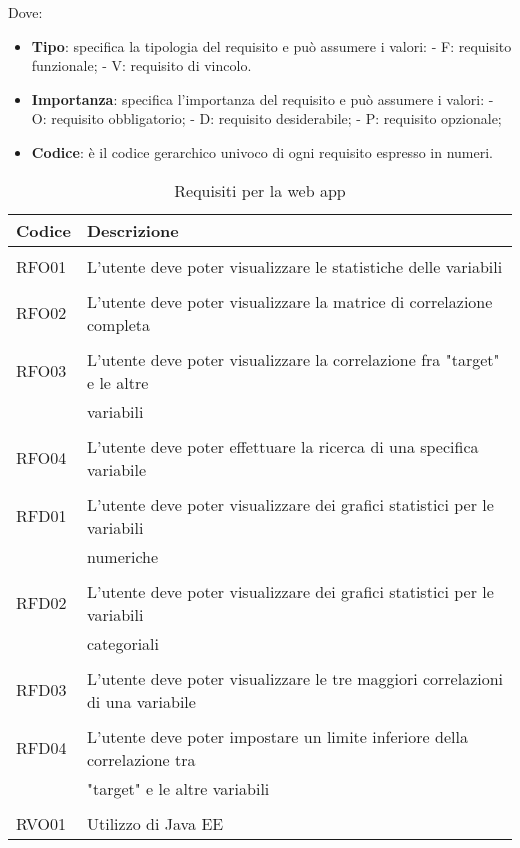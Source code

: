Dove:
\begin{itemize}
	\item \textbf{Tipo}: specifica la tipologia del requisito e può assumere i valori:
	\subitem - F: requisito funzionale;
	\subitem - V: requisito di vincolo.
	\item \textbf{Importanza}: specifica l'importanza del requisito e può assumere i valori:
	\subitem - O: requisito obbligatorio;
	\subitem - D: requisito desiderabile;
	\subitem - P: requisito opzionale; 
	\item  \textbf{Codice}: è il codice gerarchico univoco di ogni requisito espresso in numeri.
\end{itemize} 
\clearpage
\begin{table}[!h] %
	\caption{Requisiti per la web app}
	\label{tab:requisiti-app}
	\begin{tabular}{ l | l }
		\textbf{Codice} & \textbf{Descrizione}\\
		\hline
		\hline
		\\[-2mm]
		RFO01 & L'utente deve poter visualizzare le statistiche delle variabili \\
		\hline
		\\[-2mm]
		RFO02 & L'utente deve poter visualizzare la matrice di correlazione completa \\
		\hline
		\\[-2mm]
		RFO03 & L'utente deve poter visualizzare la correlazione fra "target" e le altre \\ & variabili \\
		\hline
		\\[-2mm]
		RFO04 & L'utente deve poter effettuare la ricerca di una specifica variabile \\
		\hline
		\hline
		\\[-2mm]
		RFD01 & L'utente deve poter visualizzare dei grafici statistici per le variabili \\ & numeriche \\
		\hline
		\\[-2mm]
		RFD02 & L'utente deve poter visualizzare dei grafici statistici per le variabili \\ & categoriali \\
		\hline
		\\[-2mm]
		RFD03 & L'utente deve poter visualizzare le tre maggiori correlazioni di una variabile \\
		\hline
		\\[-2mm]
		RFD04 & L'utente deve poter impostare un limite inferiore della correlazione tra \\ & "target" e le altre variabili \\
		\hline
		\hline
		\\[-2mm]
		RVO01 & Utilizzo di Java EE \\
		\hline
		\end{tabular}
\end{table}%
